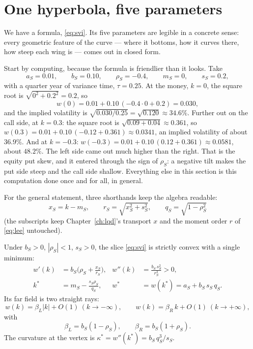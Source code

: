 \section{One hyperbola, five parameters}
\label{sec:svigeom}

We have a formula, \eqref{eq:svi}.  Its five parameters are legible in
a concrete sense: every geometric feature of the curve --- where it
bottoms, how it curves there, how steep each wing is --- comes out in
closed form.

Start by computing, because the formula is friendlier than it looks.
Take
\[
a_S=0.01,\qquad b_S=0.10,\qquad \rho_S=-0.4,\qquad m_S=0,\qquad
s_S=0.2,
\]
with a quarter year of variance time, $\tau=0.25$.  At the money,
$k=0$, the square root is $\sqrt{0^2+0.2^2}=0.2$, so
\[
w(0)=0.01+0.10\,(-0.4\cdot0+0.2)=0.030,
\]
and the implied volatility is $\sqrt{0.030/0.25}=\sqrt{0.120}\approx
34.6\%$.  Further out on the call side, at $k=0.3$: the square root is
$\sqrt{0.09+0.04}\approx0.361$, so
$w(0.3)=0.01+0.10\,(-0.12+0.361)\approx0.0341$, an implied volatility of
about $36.9\%$.  And at $k=-0.3$:
$w(-0.3)=0.01+0.10\,(0.12+0.361)\approx0.0581$, about $48.2\%$.  The
left side came out much higher than the right.  That is the equity put
skew, and it entered through the sign of $\rho_S$: a negative tilt makes
the put side steep and the call side shallow.  Everything else in this
section is this computation done once and for all, in general.

For the general statement, three shorthands keep the algebra readable:
\begin{equation}
x_S=k-m_S,\qquad r_S=\sqrt{x_S^2+s_S^2},\qquad q_S=\sqrt{1-\rho_S^2}
\label{eq:svishort}
\end{equation}
(the subscripts keep Chapter~\ref{ch:lqd}'s transport $x$ and the moment
order $r$ of \eqref{eq:lee} untouched).

\begin{proposition}
\label{prop:svigeom}
Under $b_S>0$, $|\rho_S|<1$, $s_S>0$, the slice \eqref{eq:svi} is
strictly convex with a single minimum:
\begin{align}
w'(k)&=b_S\Big(\rho_S+\frac{x_S}{r_S}\Big), &
w''(k)&=\frac{b_S\,s_S^2}{r_S^3}>0,
\label{eq:svideriv}\\
k^*&=m_S-\frac{s_S\rho_S}{q_S}, &
w^*&=w(k^*)=a_S+b_S\,s_S\,q_S .
\label{eq:svivertex}
\end{align}
Its far field is two straight rays:
\begin{equation}
w(k)=\beta_L|k|+O(1)\ (k\to-\infty),\qquad
w(k)=\beta_R\,k+O(1)\ (k\to+\infty),
\label{eq:sviwings}
\end{equation}
with
\[
\beta_L=b_S(1-\rho_S),\qquad \beta_R=b_S(1+\rho_S).
\]
The curvature at the vertex is $\kappa^*=w''(k^*)=b_S\,q_S^{3}/s_S$.
\end{proposition}

